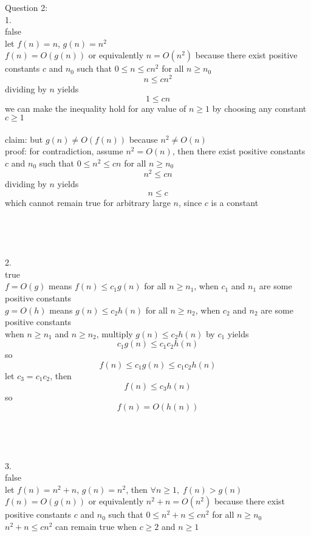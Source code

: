 \documentclass[12pt,border=4pt,multi]{article}%
\begin{document}
\newpage 
\noindent
Question 2:\\
1.\\
false\\ 
let $f(n) = n$, $g(n) = n^2$\\
$f(n) = O(g(n))$ or equivalently $n = O(n^2)$ because there exist positive constants $c$ and $n_0$ such that $0 \leq n \leq c n^2$ for all $n \geq n_0$\\
\[n \leq c n^2\]
dividing by $n$ yields
\[1 \leq c n\]
we can make the inequality hold for any value of $n \geq 1$ by choosing any constant $c \geq 1$\\
\\
claim: but $g(n) \not= O(f(n))$ because $n^2 \not= O(n)$\\
proof: for contradiction, assume $n^2 = O(n)$, then there exist positive constants $c$ and $n_0$ such that $0 \leq n^2 \leq c n$ for all $n \geq n_0$\\
\[n^2 \leq c n\]
dividing by $n$ yields
\[n \leq c\]
which cannot remain true for arbitrary large $n$, since $c$ is a constant\\
\\
\\
\\
\\
2.\\
true\\
$f = O(g)$ means $f(n) \leq c_1 g(n)$ for all $n \geq n_1$, when $c_1$ and $n_1$ are some positive constants\\
$g = O(h)$ means $g(n) \leq c_2 h(n)$ for all $n \geq n_2$, when $c_2$ and $n_2$ are some positive constants\\
when $n \geq n_1$ and $n \geq n_2$, multiply $g(n) \leq c_2 h(n)$ by $c_1$ yields
\[c_1 g(n) \leq c_1 c_2 h(n)\]
so 
\[f(n) \leq c_1 g(n) \leq c_1 c_2 h(n)\]
let $c_3 = c_1 c_2$, 
then 
\[f(n) \leq c_3 h(n)\]
so
\[f(n) = O(h(n))\]
\\
\\
\\
\\
3.\\
false\\
let $f(n) = n^2 + n$, $g(n) = n^2$, then $\forall n \geq 1,\;f(n) > g(n)$\\
$f(n) = O(g(n))$ or equivalently $n^2 + n = O(n^2)$ because there exist positive constants $c$ and $n_0$ such that $0 \leq n^2 + n \leq c n^2$ for all $n \geq n_0$\\
$n^2 + n \leq c n^2$ can remain true when $c \geq 2$ and $n \geq 1$\\
\end{document}
